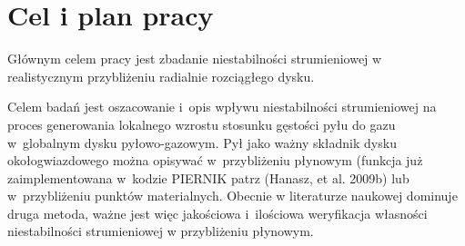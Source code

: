 \section{Cel i plan pracy}
Głównym celem pracy jest zbadanie niestabilności strumieniowej w~
realistycznym przybliżeniu radialnie rozciągłego dysku.

Celem badań jest oszacowanie i~opis wpływu niestabilności strumieniowej na
proces generowania lokalnego wzrostu stosunku gęstości pyłu do gazu w~globalnym
dysku pyłowo-gazowym. Pył jako ważny składnik dysku okołogwiazdowego można
opisywać w~przybliżeniu płynowym (funkcja już zaimplementowana w~kodzie PIERNIK
patrz (Hanasz, et al. 2009b) lub w~przybliżeniu punktów materialnych. Obecnie w
literaturze naukowej dominuje druga  metoda, ważne jest więc jakościowa
i~ilościowa weryfikacja własności niestabilności strumieniowej w przybliżeniu
płynowym.


